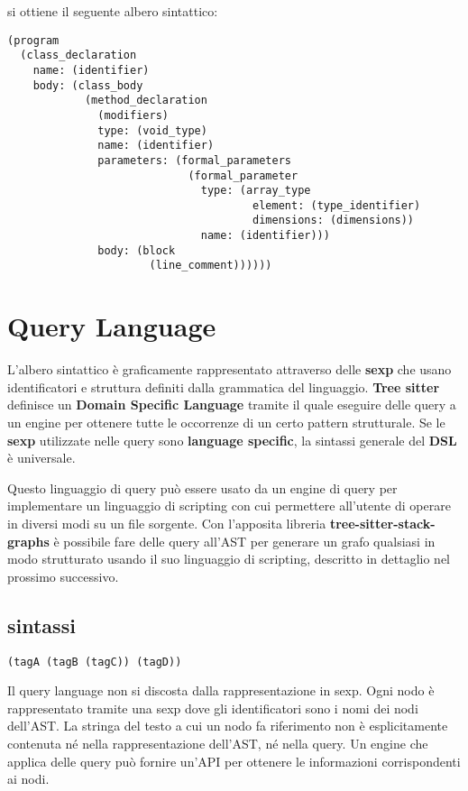 si ottiene il seguente albero sintattico:

\begin{lstlisting}
(program
  (class_declaration
    name: (identifier)
    body: (class_body
            (method_declaration
              (modifiers)
              type: (void_type)
              name: (identifier)
              parameters: (formal_parameters
                            (formal_parameter
                              type: (array_type
                                      element: (type_identifier)
                                      dimensions: (dimensions))
                              name: (identifier)))
              body: (block
                      (line_comment))))))
\end{lstlisting}

\section{Query Language}

L'albero sintattico \`e graficamente rappresentato attraverso delle \textbf{sexp} che usano identificatori e struttura definiti dalla grammatica del linguaggio.
\textbf{Tree sitter} definisce un \textbf{Domain Specific Language} \cite{TreeSitterQuerySyntax} tramite il quale eseguire delle query a un engine per ottenere tutte le occorrenze di un certo pattern strutturale.
Se le \textbf{sexp} utilizzate nelle query sono \textbf{language specific}, la sintassi generale del \textbf{DSL} \`e universale.

Questo linguaggio di query pu\`o essere usato da un engine di query per implementare un linguaggio di scripting con cui permettere all'utente di operare in diversi modi su un file sorgente.
Con l'apposita libreria \textbf{tree-sitter-stack-graphs} \`e possibile fare delle query all'AST per generare un grafo qualsiasi in modo strutturato usando il suo linguaggio di scripting, descritto in dettaglio nel prossimo successivo.

\subsection{sintassi}

\begin{lstlisting}
(tagA (tagB (tagC)) (tagD))
\end{lstlisting}

Il query language non si discosta dalla rappresentazione in sexp.
Ogni nodo \`e rappresentato tramite una sexp dove gli identificatori sono i nomi dei nodi dell'AST.
La stringa del testo a cui un nodo fa riferimento non \`e esplicitamente contenuta n\'e nella rappresentazione dell'AST, n\'e nella query.
Un engine che applica delle query pu\`o fornire un'API per ottenere le informazioni corrispondenti ai nodi.

